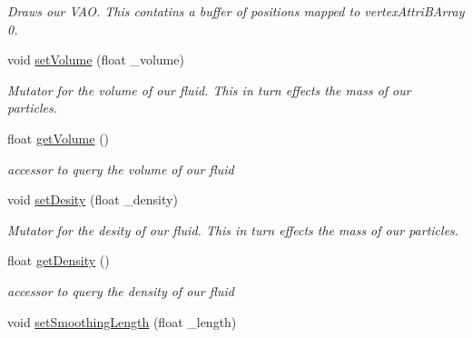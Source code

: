 \begin{DoxyCompactItemize}
\begin{DoxyCompactList}\small\item\em Draws our V\-A\-O. This contatins a buffer of positions mapped to vertex\-Attri\-B\-Array 0. \end{DoxyCompactList}\item 
\hypertarget{class_s_p_h_engine_add241056dc1719b3a11486da48c3724c}{void \hyperlink{class_s_p_h_engine_add241056dc1719b3a11486da48c3724c}{set\-Volume} (float \-\_\-volume)}\label{class_s_p_h_engine_add241056dc1719b3a11486da48c3724c}

\begin{DoxyCompactList}\small\item\em Mutator for the volume of our fluid. This in turn effects the mass of our particles. \end{DoxyCompactList}\item 
\hypertarget{class_s_p_h_engine_a588d8e6f1276d07adb5363c8c3766fda}{float \hyperlink{class_s_p_h_engine_a588d8e6f1276d07adb5363c8c3766fda}{get\-Volume} ()}\label{class_s_p_h_engine_a588d8e6f1276d07adb5363c8c3766fda}

\begin{DoxyCompactList}\small\item\em accessor to query the volume of our fluid \end{DoxyCompactList}\item 
\hypertarget{class_s_p_h_engine_acbc638f7ab8fa2ab356dadf677df10c6}{void \hyperlink{class_s_p_h_engine_acbc638f7ab8fa2ab356dadf677df10c6}{set\-Desity} (float \-\_\-density)}\label{class_s_p_h_engine_acbc638f7ab8fa2ab356dadf677df10c6}

\begin{DoxyCompactList}\small\item\em Mutator for the desity of our fluid. This in turn effects the mass of our particles. \end{DoxyCompactList}\item 
\hypertarget{class_s_p_h_engine_a8ee29d26f9451d81a07abde5b1aa53c6}{float \hyperlink{class_s_p_h_engine_a8ee29d26f9451d81a07abde5b1aa53c6}{get\-Density} ()}\label{class_s_p_h_engine_a8ee29d26f9451d81a07abde5b1aa53c6}

\begin{DoxyCompactList}\small\item\em accessor to query the density of our fluid \end{DoxyCompactList}\item 
\hypertarget{class_s_p_h_engine_a196e04ba23d9d9c73924f3af8a8240ed}{void \hyperlink{class_s_p_h_engine_a196e04ba23d9d9c73924f3af8a8240ed}{set\-Smoothing\-Length} (float \-\_\-length)}\label{class_s_p_h_engine_a196e04ba23d9d9c73924f3af8a8240ed}


\end{DoxyCompactItemize}

